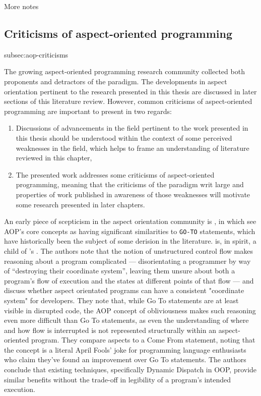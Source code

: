 More notes~

\subsection{Criticisms of aspect-oriented programming}{subsec:aop-criticisms}

The growing aspect-oriented programming research community collected both
proponents and detractors of the paradigm. The developments in
aspect orientation pertinent to the research presented in this thesis are
discussed in later sections of this literature review. However, common
criticisms of aspect-oriented programming are important to present in two
regards:

\begin{enumerate}
    \item Discussions of advancements in the field pertinent to the work
    presented in this thesis should be understood within the context of some
    perceived weaknesses in the field, which helps to frame an understanding of
    literature reviewed in this chapter,
    \item The presented work addresses some criticisms of aspect-oriented
    programming, meaning that the criticisms of the paradigm writ large and
    properties of work published in awareness of those weaknesses will motivate
    some research presented in later chapters.
\end{enumerate}

An early piece of scepticism in the aspect orientation community is
\cite{Constantinides04aopconsidered}, in which
\citeauthor{Constantinides04aopconsidered} see AOP's core concepts as having
significant similarities to \lstinline{GO-TO} statements, which have
historically been the subject of some derision in the literature.
\cite{Constantinides04aopconsidered} is, in spirit, a child of
\citeauthor{dijkstra1968letters}'s . The authors
note that the notion of unstructured control flow makes reasoning about a
program complicated --- disorientating a programmer by way of ``destroying their
coordinate system'', leaving them unsure about both a program's flow of
execution and the states at different points of that flow --- and discuss
whether aspect orientated programs can have a consistent "coordinate system" for
developers. They note that, while Go To statements are at least visible in
disrupted code, the AOP concept of obliviousness makes such reasoning even more
difficult than Go To statements, as even the understanding of where and how flow
is interrupted is not represented structurally within an aspect-oriented
program. They compare aspects to a Come From statement, noting that the concept
is a literal April Fools' joke for programming language enthusiasts who claim
they've found an improvement over Go To statements. The authors conclude that
existing techniques, specifically Dynamic Dispatch in OOP, provide similar
benefits without the trade-off in legibility of a program's intended execution.


